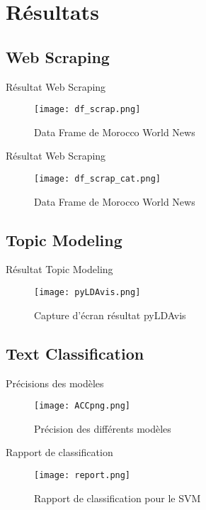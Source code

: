 \documentclass[10pt,sans,usenames,dvipsnames,english,compress]{beamer}
\begin{document}
\section{Résultats}
\subsection{Web Scraping}
\begin{frame}{Résultat Web Scraping}
    \begin{figure}[!h]
    \centering
    \texttt{[image: df\_scrap.png]}
    \caption{Data Frame de Morocco World News}
    \end{figure}
\end{frame}

\begin{frame}{Résultat Web Scraping}
    \begin{figure}[!h]
    \centering
    \texttt{[image: df\_scrap\_cat.png]}
    \caption{Data Frame de Morocco World News}
    \end{figure}
\end{frame}

\subsection{Topic Modeling}
\begin{frame}{Résultat Topic Modeling}
    \begin{figure}[!h]
    \centering
    \texttt{[image: pyLDAvis.png]}
    \caption{Capture d'écran résultat pyLDAvis}
    \end{figure}
\end{frame}

\subsection{Text Classification}
\begin{frame}{Précisions des modèles}
    \begin{figure}[!h]
    \centering
    \texttt{[image: ACCpng.png]}
    \caption{Précision des différents modèles}
    \end{figure}
\end{frame}

\begin{frame}{Rapport de classification}
    \begin{figure}[!h]
    \centering
    \texttt{[image: report.png]}
    \caption{Rapport de classification pour le SVM}
    \end{figure}
\end{frame}
\end{document}
